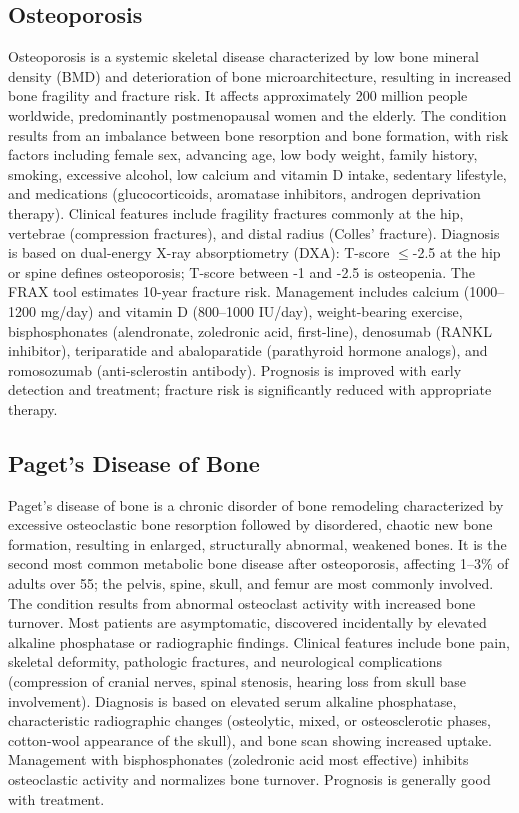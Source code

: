 \subsection{Osteoporosis}
\label{sec:Osteoporosis}
Osteoporosis is a systemic skeletal disease characterized by low bone mineral density (BMD) and deterioration of bone microarchitecture, resulting in increased bone fragility and fracture risk. It affects approximately 200 million people worldwide, predominantly postmenopausal women and the elderly. The condition results from an imbalance between bone resorption and bone formation, with risk factors including female sex, advancing age, low body weight, family history, smoking, excessive alcohol, low calcium and vitamin D intake, sedentary lifestyle, and medications (glucocorticoids, aromatase inhibitors, androgen deprivation therapy). Clinical features include fragility fractures commonly at the hip, vertebrae (compression fractures), and distal radius (Colles' fracture). Diagnosis is based on dual-energy X-ray absorptiometry (DXA): T-score $\leq$-2.5 at the hip or spine defines osteoporosis; T-score between -1 and -2.5 is osteopenia. The FRAX tool estimates 10-year fracture risk. Management includes calcium (1000--1200 mg/day) and vitamin D (800--1000 IU/day), weight-bearing exercise, bisphosphonates (alendronate, zoledronic acid, first-line), denosumab (RANKL inhibitor), teriparatide and abaloparatide (parathyroid hormone analogs), and romosozumab (anti-sclerostin antibody). Prognosis is improved with early detection and treatment; fracture risk is significantly reduced with appropriate therapy.

\subsection{Paget's Disease of Bone}
\label{sec:Paget's Disease of Bone}
Paget's disease of bone is a chronic disorder of bone remodeling characterized by excessive osteoclastic bone resorption followed by disordered, chaotic new bone formation, resulting in enlarged, structurally abnormal, weakened bones. It is the second most common metabolic bone disease after osteoporosis, affecting 1--3\% of adults over 55; the pelvis, spine, skull, and femur are most commonly involved. The condition results from abnormal osteoclast activity with increased bone turnover. Most patients are asymptomatic, discovered incidentally by elevated alkaline phosphatase or radiographic findings. Clinical features include bone pain, skeletal deformity, pathologic fractures, and neurological complications (compression of cranial nerves, spinal stenosis, hearing loss from skull base involvement). Diagnosis is based on elevated serum alkaline phosphatase, characteristic radiographic changes (osteolytic, mixed, or osteosclerotic phases, cotton-wool appearance of the skull), and bone scan showing increased uptake. Management with bisphosphonates (zoledronic acid most effective) inhibits osteoclastic activity and normalizes bone turnover. Prognosis is generally good with treatment.

